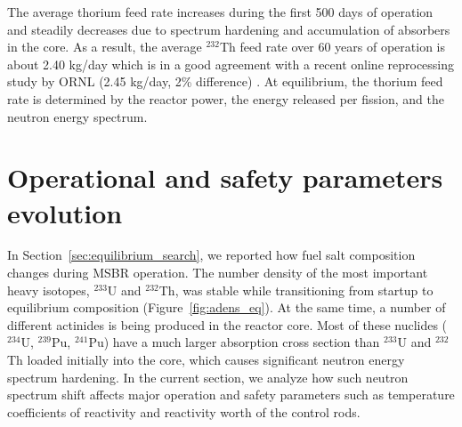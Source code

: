 The average thorium feed rate increases during the first 500 days of operation 
and steadily decreases due to spectrum hardening and accumulation of absorbers 
in the core. As a result, the average $^{232}$Th feed rate over 60 years of 
operation is about 2.40 kg/day which is in a good agreement with a recent 
online reprocessing study by \gls{ORNL} (2.45 kg/day, 2\% difference) 
\cite{betzler_molten_2017, betzler_personal_2017}. At equilibrium, the thorium 
feed rate is determined by the reactor power, the energy released per fission, 
and the neutron energy spectrum.


\section{Operational and safety parameters evolution}
In Section~\ref{sec:equilibrium_search}, we reported how fuel salt composition 
changes during \gls{MSBR} operation. The number density of the most 
important heavy isotopes, $^{233}$U and $^{232}$Th, was stable while 
transitioning from startup to equilibrium composition  
(Figure~\ref{fig:adens_eq}). At the same time, a number of different 
actinides is being produced in the reactor core. Most of these nuclides 
($^{234}$U, $^{239}$Pu, $^{241}$Pu) have a much larger absorption cross 
section than $^{233}$U and $^{232}$Th loaded initially into the core, which 
causes significant neutron energy spectrum hardening. In the current section, 
we analyze how such neutron spectrum shift affects major operation and safety 
parameters such as temperature coefficients of reactivity and reactivity worth 
of the control rods. 

